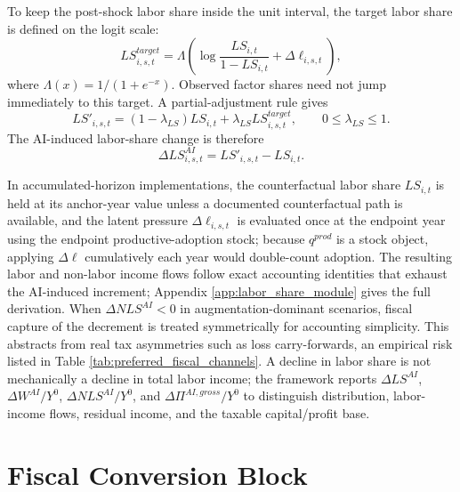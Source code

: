 \documentclass[11pt,a4paper]{article}
\begin{document}
To keep the post-shock labor share inside the unit interval, the target labor share is defined on the logit scale:
\begin{equation}
    LS^{target}_{i,s,t}
    =
    \Lambda\left(
    \log\frac{LS_{i,t}}{1-LS_{i,t}}+
    \Delta \ell_{i,s,t}
    \right),
\end{equation}
where $\Lambda(x)=1/(1+e^{-x})$. Observed factor shares need not jump immediately to this target. A partial-adjustment rule gives
\begin{equation}
    LS'_{i,s,t}
    =
    (1-\lambda_{LS})LS_{i,t}
    +
    \lambda_{LS}LS^{target}_{i,s,t},
    \qquad 0\leq\lambda_{LS}\leq1.
\end{equation}
The AI-induced labor-share change is therefore
\begin{equation}
    \Delta LS^{AI}_{i,s,t}=LS'_{i,s,t}-LS_{i,t}.
\end{equation}

In accumulated-horizon implementations, the counterfactual labor share $LS_{i,t}$ is held at its anchor-year value unless a documented counterfactual path is available, and the latent pressure $\Delta\ell_{i,s,t}$ is evaluated once at the endpoint year using the endpoint productive-adoption stock; because $q^{prod}$ is a stock object, applying $\Delta\ell$ cumulatively each year would double-count adoption.
The resulting labor and non-labor income flows follow exact accounting identities that exhaust the AI-induced increment; Appendix \ref{app:labor_share_module} gives the full derivation. When $\Delta NLS^{AI}<0$ in augmentation-dominant scenarios, fiscal capture of the decrement is treated symmetrically for accounting simplicity. This abstracts from real tax asymmetries such as loss carry-forwards, an empirical risk listed in Table \ref{tab:preferred_fiscal_channels}. A decline in labor share is not mechanically a decline in total labor income; the framework reports $\Delta LS^{AI}$, $\Delta W^{AI}/Y^0$, $\Delta NLS^{AI}/Y^0$, and $\Delta\Pi^{AI,gross}/Y^0$ to distinguish distribution, labor-income flows, residual income, and the taxable capital/profit base.




\section{Fiscal Conversion Block}\label{sec:fiscal_conversion}
\end{document}
